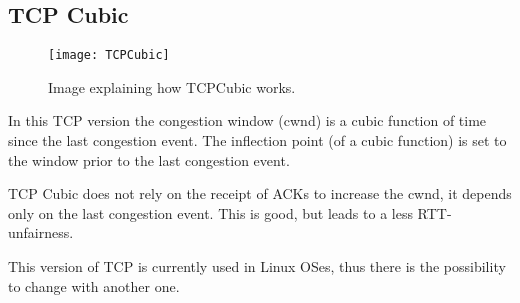 \subsection{TCP Cubic}

\begin{figure}[t]
  \centering
  \texttt{[image: TCPCubic]}
  \caption{Image explaining how TCPCubic works.}
\end{figure}

In this TCP version the congestion window (cwnd) is a cubic function of time
since the last congestion event.
The inflection point (of a cubic function) is set to the window prior to the
last congestion event.

TCP Cubic does not rely on the receipt of ACKs to increase the cwnd, it
depends only on the last congestion event. This is good, but leads to a less
RTT-unfairness.

This version of TCP is currently used in Linux OSes, thus there is the
possibility to change with another one.
